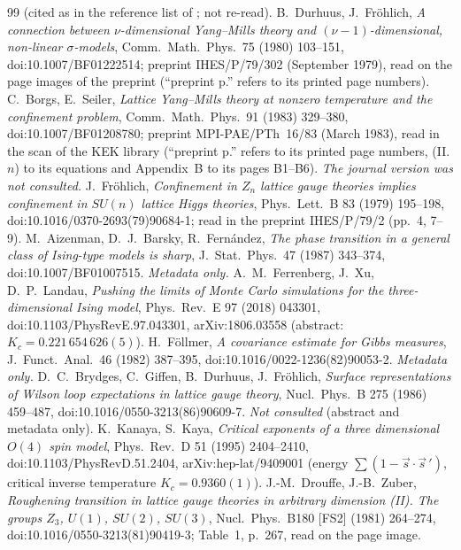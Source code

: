 \documentclass[11pt,a4paper]{article}
\theoremstyle{remark}
\theoremstyle{definition}
\theoremstyle{plain}
\theoremstyle{remark}
\begin{document}
\begin{thebibliography}{99}
(cited as in the reference list of \cite{Wu06}; not re-read).
 B.~Durhuus, J.~Fr\"ohlich, \emph{A connection between $\nu$-dimensional Yang--Mills theory and $(\nu-1)$-dimensional, non-linear $\sigma$-models},
Comm.\ Math.\ Phys.\ 75 (1980) 103--151, doi:10.1007/BF01222514; preprint IHES/P/79/302 (September 1979), read on the page images of the preprint (``preprint p.''
refers to its printed page numbers).
 C.~Borgs, E.~Seiler, \emph{Lattice Yang--Mills theory at nonzero temperature and the confinement problem}, Comm.\ Math.\ Phys.\ 91 (1983) 329--380,
doi:10.1007/BF01208780; preprint MPI-PAE/PTh~16/83 (March 1983), read in the scan of the KEK library (``preprint p.'' refers to its printed page numbers, (II.$n$) to its
equations and Appendix~B to its pages B1--B6). \emph{The journal version was not consulted.}
 J.~Fr\"ohlich, \emph{Confinement in $Z_n$ lattice gauge theories implies confinement in $SU(n)$ lattice Higgs theories}, Phys.\ Lett.\ B 83 (1979) 195--198,
doi:10.1016/0370-2693(79)90684-1; read in the preprint IHES/P/79/2 (pp.~4, 7--9).
 M.~Aizenman, D.~J.~Barsky, R.~Fern\'andez, \emph{The phase transition in a general class of Ising-type models is sharp}, J.\ Stat.\ Phys.\ 47 (1987) 343--374,
doi:10.1007/BF01007515. \emph{Metadata only.}
 A.~M.~Ferrenberg, J.~Xu, D.~P.~Landau, \emph{Pushing the limits of Monte Carlo simulations for the three-dimensional Ising model}, Phys.\ Rev.\ E 97 (2018) 043301,
doi:10.1103/PhysRevE.97.043301, arXiv:1806.03558 (abstract: $K_c=0.221\,654\,626(5)$).
 H.~F\"ollmer, \emph{A covariance estimate for Gibbs measures}, J.\ Funct.\ Anal.\ 46 (1982) 387--395, doi:10.1016/0022-1236(82)90053-2. \emph{Metadata only.}
 D.~C.~Brydges, C.~Giffen, B.~Durhuus, J.~Fr\"ohlich, \emph{Surface representations of Wilson loop expectations in lattice gauge theory}, Nucl.\ Phys.\ B 275 (1986) 459--487,
doi:10.1016/0550-3213(86)90609-7. \emph{Not consulted} (abstract and metadata only).
 K.~Kanaya, S.~Kaya, \emph{Critical exponents of a three dimensional $O(4)$ spin model}, Phys.\ Rev.\ D 51 (1995) 2404--2410, doi:10.1103/PhysRevD.51.2404, arXiv:hep-lat/9409001
(energy $\sum(1-\vec s\cdot\vec s\,')$, critical inverse temperature $K_c=0.9360(1)$).
 J.-M.~Drouffe, J.-B.~Zuber, \emph{Roughening transition in lattice gauge theories in arbitrary dimension (II). The groups $Z_3$, $U(1)$, $SU(2)$, $SU(3)$},
Nucl.\ Phys.\ B180 [FS2] (1981) 264--274, doi:10.1016/0550-3213(81)90419-3; Table~1, p.~267, read on the page image.

\end{thebibliography}
\end{document}
